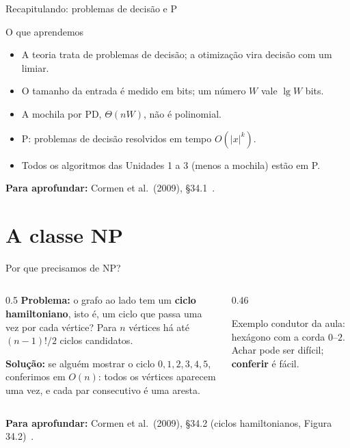 \documentclass[aspectratio=169,xcolor=table]{beamer}
\newcommand{\arestashexa}{0/1, 1/2, 2/3, 3/4, 4/5, 5/0, 0/2}
\newcommand{\noshexa}{%
  \foreach \i in {0,...,5} \node[vert] (h\i) at ({90+60*\i}:0.95) {\i};
}
\newcommand{\hexa}[2]{%
  \noshexa
  \def\listaA{#2}\ifx\listaA\empty\else
    \foreach \u/\v in {#2} \draw[ares] (h\u) -- (h\v);\fi
  \foreach \u/\v in \arestashexa \draw[aresta] (h\u) -- (h\v);
  \def\listaV{#1}\ifx\listaV\empty\else
    \foreach \v in {#1} \node[vS] at (h\v) {\v};\fi
}
\newcommand{\fonte}[1]{%
  \vfill
  {\tiny\color{gray!55!black}\textbf{Para aprofundar:} #1\par}%
}
\begin{document}
\begin{frame}{Recapitulando: problemas de decisão e P}
  \begin{block}{O que aprendemos}
    \begin{itemize}
      \item A teoria trata de problemas de decisão; a otimização vira decisão com um limiar.
      \item O tamanho da entrada é medido em bits; um número $W$ vale $\lg W$ bits.
      \item A mochila por PD, $\Theta(nW)$, não é polinomial.
      \item P: problemas de decisão resolvidos em tempo $O(|x|^k)$.
      \item Todos os algoritmos das Unidades 1 a 3 (menos a mochila) estão em P.
    \end{itemize}
  \end{block}
  \fonte{Cormen et al.\ (2009), \S 34.1~\cite{cormen2009introduction}.}
\end{frame}

\section{A classe NP}

\begin{frame}{Por que precisamos de NP?}
  \begin{columns}[T]
    \begin{column}{0.5\textwidth}
      \textbf{Problema:} o grafo ao lado tem um \textbf{ciclo hamiltoniano}, isto é, um
      ciclo que passa uma vez por cada vértice? Para $n$ vértices há até $(n-1)!/2$ ciclos
      candidatos.
      \medskip

      \textbf{Solução:} se alguém mostrar o ciclo $0, 1, 2, 3, 4, 5$, conferimos em
      $O(n)$: todos os vértices aparecem uma vez, e cada par consecutivo é uma aresta.
    \end{column}
    \begin{column}{0.46\textwidth}
      \begin{center}
      \end{center}
      {\scriptsize Exemplo condutor da aula: hexágono com a corda $0$--$2$. Achar pode ser
      difícil; \textbf{conferir} é fácil.\par}
    \end{column}
  \end{columns}
  \fonte{Cormen et al.\ (2009), \S 34.2 (ciclos hamiltonianos, Figura 34.2)~\cite{cormen2009introduction}.}
\end{frame}
\end{document}
